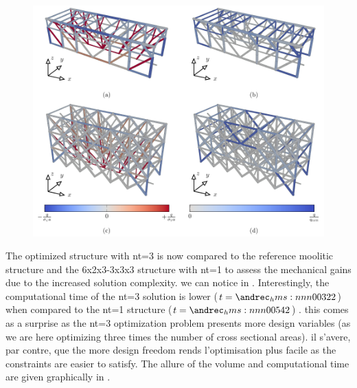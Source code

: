 \begin{figure}
    \centering
    \includegraphics[width=\linewidth]{figures/05_cellular_opt/00_multiple_failure/mul_mech.pdf}
    \caption{}
    \label{fig:05_multiple_topology_sol_mech}
\end{figure}

The optimized structure with nt=3 is now compared to the reference moolitic structure and the 6x2x3-3x3x3 structure with nt=1 to assess the mechanical gains due to the increased solution complexity. we can notice in . Interestingly, the computational time of the nt=3 solution is lower ($t=\hms{00;3;22}$) when compared to the nt=1 structure ($t=\hms{00;5;42}$) . this comes as a surprise as the nt=3 optimization problem presents more design variables (as we are here optimizing three times the number of cross sectional areas). il s'avere, par contre, que the more design freedom rends l'optimisation plus facile as the constraints are easier to satisfy. The allure of the volume and computational time are given graphically in .

